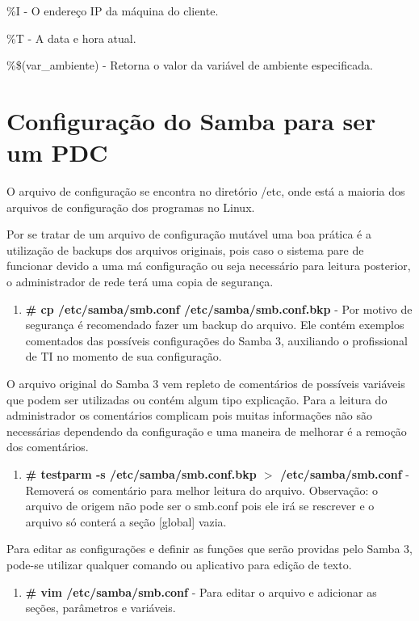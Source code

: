 \%I - O endereço IP da máquina do cliente.

\%T - A data e hora atual.

\%\$(var\_ambiente) - Retorna o valor da variável de ambiente especificada.

\section{Configuração do Samba para ser um PDC}

O arquivo de configuração se encontra no diretório /etc, onde está a maioria dos arquivos de configuração dos programas no Linux.

Por se tratar de um arquivo de configuração mutável uma boa prática é a utilização de backups dos arquivos originais, pois caso o sistema pare de funcionar devido a uma má configuração ou seja necessário para leitura posterior, o administrador de rede terá uma copia de segurança.

\begin{enumerate}
	\item \textbf{\# cp /etc/samba/smb.conf /etc/samba/smb.conf.bkp} - Por motivo de segurança é recomendado fazer um backup do arquivo. Ele contém exemplos comentados das possíveis configurações do Samba 3, auxiliando o profissional de TI no momento de sua configuração.
\end{enumerate}

O arquivo original do Samba 3 vem repleto de comentários de possíveis variáveis que podem ser utilizadas ou contém algum tipo explicação. Para a leitura do administrador os comentários complicam pois muitas informações não são necessárias dependendo da configuração e uma maneira de melhorar é a remoção dos comentários.

\begin{enumerate}
	\item \textbf{\# testparm -s /etc/samba/smb.conf.bkp $>$ /etc/samba/smb.conf} - Removerá os comentário para melhor leitura do arquivo. Observação: o arquivo de origem não pode ser o smb.conf pois ele irá se rescrever e o arquivo só conterá a seção [global] vazia.
\end{enumerate}

Para editar as configurações e definir as funções que serão providas pelo Samba 3, pode-se utilizar qualquer comando ou aplicativo para edição de texto. 

\begin{enumerate}
	\item \textbf{\# vim /etc/samba/smb.conf} - Para editar o arquivo e adicionar as seções, parâmetros e variáveis.
\end{enumerate}

